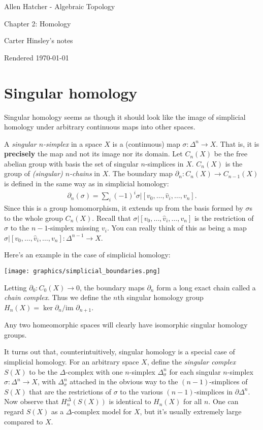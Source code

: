 \documentclass[a4paper]{article}
\begin{document}
\begin{center}
\LARGE{Allen Hatcher - Algebraic Topology}

\Large{Chapter 2: Homology}

\large{Carter Hinsley's notes}

Rendered \today
\end{center}

\section{Singular homology}

Singular homology seems as though it should look like the image of simplicial homology under arbitrary continuous maps into other spaces.

A \emph{singular $n$-simplex} in a space $X$ is a (continuous) map $\sigma : \Delta^n \to X$. That is, it is \textbf{precisely} the map and not its image nor its domain. Let $C_n(X)$ be the free abelian group with basis the set of singular $n$-simplices in $X$. $C_n(X)$ is the group of \emph{(singular) $n$-chains} in $X$. The boundary map $\partial_n : C_n(X) \to C_{n-1}(X)$ is defined in the same way as in simplicial homology:
\begin{align}
    \partial_n(\sigma) = \sum_i (-1)^i \sigma | [v_0, \ldots, \hat{v}_i, \ldots, v_n].
\end{align}
Since this is a group homomorphism, it extends up from the basis formed by $\sigma$s to the whole group $C_n(X)$. Recall that $\sigma|[v_0, \ldots, \hat{v}_i, \ldots, v_n]$ is the restriction of $\sigma$ to the $n-1$-simplex missing $v_i$. You can really think of this as being a map $\sigma|[v_0, \ldots, \hat{v}_i, \ldots, v_n] : \Delta^{n-1} \to X$.

Here's an example in the case of simplicial homology:
\begin{center}
\texttt{[image: graphics/simplicial\_boundaries.png]}
\end{center}

Letting $\partial_0 : C_0(X) \to 0$, the boundary maps $\partial_n$ form a long exact chain called a \emph{chain complex}. Thus we define the $n$th singular homology group $H_n(X) = \ker \partial_n / \text{im } \partial_{n+1}$.

Any two homeomorphic spaces will clearly have isomorphic singular homology groups.

It turns out that, counterintuitively, singular homology is a special case of simplicial homology. For an arbitrary space $X$, define the \emph{singular complex} $S(X)$ to be the $\Delta$-complex with one $n$-simplex $\Delta_\sigma^n$ for each singular $n$-simplex $\sigma : \Delta^n \to X$, with $\Delta_\sigma^n$ attached in the obvious way to the $(n-1)$-simplices of $S(X)$ that are the restrictions of $\sigma$ to the various $(n-1)$-simplices in $\partial \Delta^n$. Now observe that $H_n^\Delta(S(X))$ is identical to $H_n(X)$ for all $n$. One can regard $S(X)$ as a $\Delta$-complex model for $X$, but it's usually extremely large compared to $X$.
\end{document}
